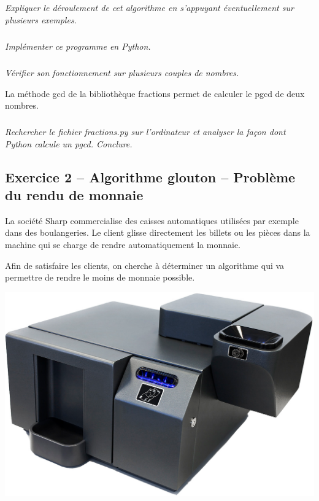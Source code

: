 \documentclass[10pt]{article}
\begin{document}
\subparagraph{}
\textit{Expliquer le déroulement de cet algorithme en s'appuyant éventuellement sur plusieurs exemples.}

\subparagraph{}
\textit{Implémenter ce programme en Python.}

\subparagraph{}
\textit{Vérifier son fonctionnement sur plusieurs couples de nombres.}


La méthode \textsf{gcd} de la bibliothèque \textsf{fractions} permet de calculer le pgcd de deux nombres.

\subparagraph{}
\textit{Rechercher le fichier \textsf{fractions.py} sur l'ordinateur et analyser la façon dont Python calcule un pgcd. Conclure.}



\subsection*{Exercice 2 -- Algorithme glouton -- Problème du rendu de monnaie}
\begin{minipage}[c]{.6\linewidth}
La société Sharp commercialise des caisses automatiques utilisées par exemple dans des boulangeries. Le client glisse directement les billets ou les pièces dans la machine qui se charge de rendre automatiquement la monnaie. 
\begin{obj}
Afin de satisfaire les clients, on cherche à déterminer un algorithme qui va permettre de rendre le moins de monnaie possible. 
\end{obj}
\end{minipage}\hfill
\begin{minipage}[c]{.37\linewidth}
\begin{center}
\includegraphics[width=.9\textwidth]{images/sharp.png}
\end{center}
\end{minipage}
\end{document}
